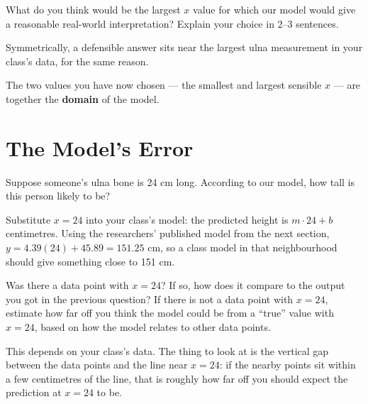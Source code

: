\documentclass[12pt]{ximera}
\begin{document}
\begin{problem}
What do you think would be the largest $x$ value for which our model would give a
reasonable real-world interpretation? Explain your choice in 2--3 sentences.

\begin{freeResponse}
\end{freeResponse}

\begin{solution}
Symmetrically, a defensible answer sits near the largest ulna measurement in your
class's data, for the same reason.

The two values you have now chosen --- the smallest and largest sensible $x$ --- are
together the \textbf{domain} of the model.
\end{solution}
\end{problem}

\section*{The Model's Error}

\begin{problem}
Suppose someone's ulna bone is 24 cm long. According to our model, how tall is this
person likely to be?

\begin{freeResponse}
\end{freeResponse}

\begin{solution}
Substitute $x = 24$ into your class's model: the predicted height is $m \cdot 24 + b$
centimetres. Using the researchers' published model from the next section,
$y = 4.39(24) + 45.89 = 151.25$ cm, so a class model in that neighbourhood should give
something close to 151 cm.
\end{solution}
\end{problem}

\begin{problem}
Was there a data point with $x = 24$? If so, how does it compare to the output you got
in the previous question? If there is not a data point with $x = 24$, estimate how far
off you think the model could be from a ``true'' value with $x = 24$, based on how the
model relates to other data points.

\begin{freeResponse}
\end{freeResponse}

\begin{solution}
This depends on your class's data. The thing to look at is the vertical gap between the
data points and the line near $x = 24$: if the nearby points sit within a few
centimetres of the line, that is roughly how far off you should expect the prediction at
$x = 24$ to be.
\end{solution}
\end{problem}
\end{document}
